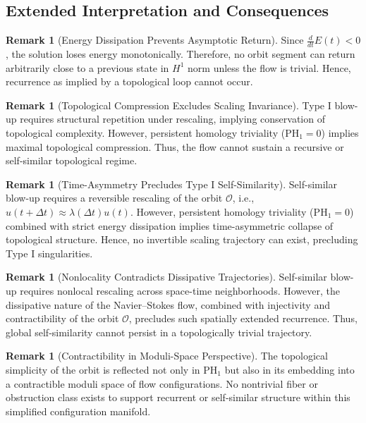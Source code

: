 \documentclass[11pt]{article}
\theoremstyle{definition}
\newtheorem{remark}[theorem]{Remark}
\begin{document}
\subsection{Extended Interpretation and Consequences}

\begin{remark}[Energy Dissipation Prevents Asymptotic Return]
Since $\frac{d}{dt} E(t) < 0$, the solution loses energy monotonically. Therefore, no orbit segment can return arbitrarily close to a previous state in $H^1$ norm unless the flow is trivial. Hence, recurrence as implied by a topological loop cannot occur.
\end{remark}

\begin{remark}[Topological Compression Excludes Scaling Invariance]
Type I blow-up requires structural repetition under rescaling, implying conservation of topological complexity. However, persistent homology triviality ($\mathrm{PH}_1 = 0$) implies maximal topological compression. Thus, the flow cannot sustain a recursive or self-similar topological regime.
\end{remark}

\begin{remark}[Time-Asymmetry Precludes Type I Self-Similarity]
Self-similar blow-up requires a reversible rescaling of the orbit $\mathcal{O}$, i.e., $u(t+\Delta t) \approx \lambda(\Delta t) u(t)$. However, persistent homology triviality ($\mathrm{PH}_1 = 0$) combined with strict energy dissipation implies time-asymmetric collapse of topological structure. Hence, no invertible scaling trajectory can exist, precluding Type I singularities.
\end{remark}

\begin{remark}[Nonlocality Contradicts Dissipative Trajectories]
Self-similar blow-up requires nonlocal rescaling across space-time neighborhoods. However, the dissipative nature of the Navier--Stokes flow, combined with injectivity and contractibility of the orbit $\mathcal{O}$, precludes such spatially extended recurrence. Thus, global self-similarity cannot persist in a topologically trivial trajectory.
\end{remark}

\begin{remark}[Contractibility in Moduli-Space Perspective]
The topological simplicity of the orbit is reflected not only in $\mathrm{PH}_1$ but also in its embedding into a contractible moduli space of flow configurations. No nontrivial fiber or obstruction class exists to support recurrent or self-similar structure within this simplified configuration manifold.
\end{remark}
\end{document}
